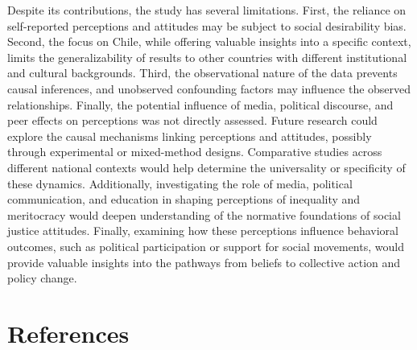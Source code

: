 \documentclass[
  12pt,
]{article}
\begin{document}
Despite its contributions, the study has several limitations. First, the
reliance on self-reported perceptions and attitudes may be subject to
social desirability bias. Second, the focus on Chile, while offering
valuable insights into a specific context, limits the generalizability
of results to other countries with different institutional and cultural
backgrounds. Third, the observational nature of the data prevents causal
inferences, and unobserved confounding factors may influence the
observed relationships. Finally, the potential influence of media,
political discourse, and peer effects on perceptions was not directly
assessed. Future research could explore the causal mechanisms linking
perceptions and attitudes, possibly through experimental or mixed-method
designs. Comparative studies across different national contexts would
help determine the universality or specificity of these dynamics.
Additionally, investigating the role of media, political communication,
and education in shaping perceptions of inequality and meritocracy would
deepen understanding of the normative foundations of social justice
attitudes. Finally, examining how these perceptions influence behavioral
outcomes, such as political participation or support for social
movements, would provide valuable insights into the pathways from
beliefs to collective action and policy change.

\section{References}\label{references}
\end{document}
